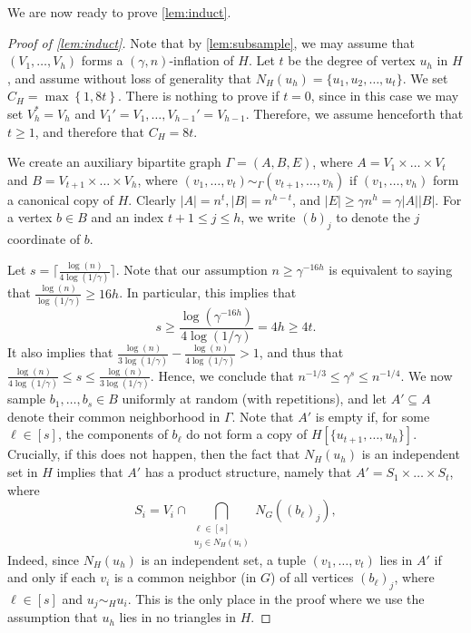 \documentclass[11pt]{article}
\numberwithin{equation}{section}
\theoremstyle{plain}
\theoremstyle{remark}
\newcommand\cei[1]{\lceil #1 \rceil}
\begin{document}
We are now ready to prove \cref{lem:induct}.

\begin{proof}[Proof of \cref{lem:induct}]
Note that by \cref{lem:subsample}, we may assume that $(V_1,\dots,V_h)$ forms a $(\gamma,n)$-inflation of $H$.
Let $t$ be the degree of vertex $u_h$ in $H$, and assume without loss of generality that $N_H(u_h) = \{u_1,u_2,\dots,u_t\}$. 
We set $C_H = \max \left\{ 1, 8t \right\}$. 
There is nothing to prove if $t=0$, since in this case we may set $V_h^*=V_h$ and $V_1'=V_1,\dots,V_{h-1}'=V_{h-1}$. Therefore, we assume henceforth that $t\geq 1$, and therefore that $C_H=8t$.


We create an auxiliary bipartite graph $\Gamma = (A,B,E)$, where $A = V_1\times \dots\times V_t$ and $B = V_{t+1}\times\dots \times V_h$, where $(v_1,\dots,v_t)\sim_\Gamma (v_{t+1},\dots,v_h)$ if $(v_1,\dots,v_h)$ form a canonical copy of $H$. Clearly $|A|= n^t, |B|=n^{h-t}$, and $|E|\ge \gamma n^h = \gamma |A||B|$. For a vertex $b \in B$ and an index $t +1 \leq j \leq h$, we write $(b)_j$ to denote the $j$ coordinate of $b$.


Let $s = \cei{\frac{\log(n)}{4\log(1/\gamma)}}$. Note that our assumption $n \geq \gamma^{-16h}$ is equivalent to saying that $\frac{\log (n)}{\log(1/\gamma)}\geq 16h$. In particular, this implies that
\begin{equation}\label{eq:s LB}
s \geq \frac{\log(\gamma^{-16h})}{4\log(1/\gamma)} = 4h \geq 4t.
\end{equation}
It also implies that $\frac{\log(n)}{3 \log(1/\gamma)} - \frac{\log(n)}{4 \log(1/\gamma)}>1$, and thus that
$\frac{\log(n)}{4 \log(1/\gamma)}\leq s \leq \frac{\log(n)}{3 \log(1/\gamma)}$. Hence, we conclude that $n^{-1/3}\leq \gamma^s \leq n^{-1/4}$.
We now sample $b_1,\dots,b_s\in B$ uniformly at random (with repetitions), and let $A'\subseteq A$ denote their common neighborhood in $\Gamma$. Note that $A'$ is empty if, for some $\ell \in [s]$, the components of $b_\ell$ do not form a copy of $H[\{u_{t+1},\dots,u_h\}]$. 
Crucially, if this does not happen, then the fact that $N_H(u_h)$ is an independent set in $H$ implies that $A'$ has a product structure, namely that $A' = S_1 \times \dots \times S_t$, where
\[
S_i =
V_i\cap \bigcap_{\substack{\ell \in [s]\\u_j \in N_H(u_i)}} N_G((b_\ell)_j),
\]
Indeed, since $N_H(u_h)$ is an independent set, a tuple $(v_1,\dots,v_t)$ lies in $A'$ if and only if each $v_i$ is a common neighbor (in $G$) of all vertices $(b_\ell)_j$, where $\ell \in [s]$ and $u_j \sim_H u_i$. This is the only place in the proof where we use the assumption that $u_h$ lies in no triangles in $H$.



\end{proof}
\end{document}
